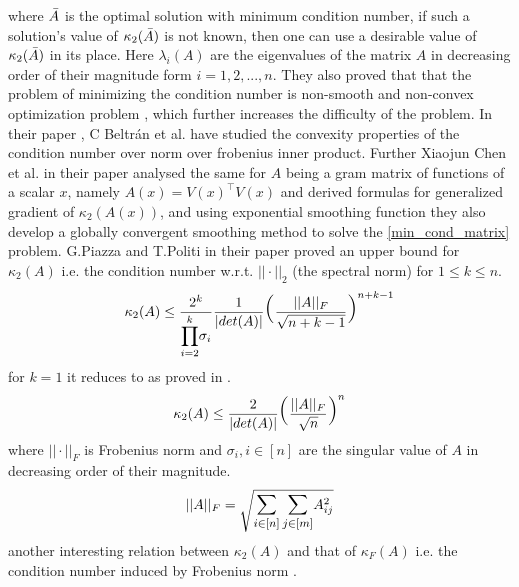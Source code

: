 where $\Bar{A}$ is the optimal solution with minimum condition number, if such a solution's value of $\kappa_2 (\Bar{A})$ is not known, then one can use a desirable value of $\kappa_2 (\Bar{A})$ in its place. Here $\lambda_i(A)$ are the eigenvalues of the matrix $A$ in decreasing order of their magnitude form $i=1,2,...,n$. They also proved that that the problem of minimizing the condition number is non-smooth and non-convex optimization problem \cite{marechal2009optimizing}, which further increases the difficulty of the problem. In their paper \cite{beltran2010convexity}, C Beltrán et al. have studied the convexity properties of the condition number over norm over frobenius inner product. Further Xiaojun Chen et al. in their paper \cite{chen2011minimizing} analysed the same for $A$ being a gram matrix of functions of a scalar $x$, namely $A(x) = V(x)^{\top}V(x)$ and derived formulas for generalized gradient of $\kappa_2(A(x))$, and using exponential smoothing function they also develop a globally convergent smoothing method to solve the \ref{min_cond_matrix} problem.
\newline \newline G.Piazza and T.Politi in their paper \cite{piazza2002upper} proved an upper bound for $\kappa_2 (A)$ i.e. the condition number w.r.t. $||\cdot||_2$ (the spectral norm) for $1\le k \le n$. 
\begin{equation} \label{cond_matx_ub_1}
    \kappa_2 (A) \le \frac{2^k}{\mathlarger{\prod_{i=2}^{k}} \sigma_i}\frac{1}{|det(A)|}\mathlarger{\mathlarger{\mathlarger{\mathlarger{(}}}} \frac{||A||_F}{\sqrt{n+k-1}}\mathlarger{\mathlarger{\mathlarger{\mathlarger{)}}}} ^{n+k-1}
\end{equation}
for $k=1$ it reduces to as proved in \cite{guggenheimer1995simple}.
\begin{equation} \label{cond_matx_ub_1.1}
    \kappa_2 (A) \le \frac{2}{|det(A)|}\mathlarger{\mathlarger{\mathlarger{\mathlarger{(}}}} \frac{||A||_F}{\sqrt{n}}\mathlarger{\mathlarger{\mathlarger{\mathlarger{) }}}} ^{n}
\end{equation}
where $||\cdot||_F$ is Frobenius norm and $\sigma_i, i\in [n]$ are the singular value of $A$ in decreasing order of their magnitude.
\begin{equation} \label{frobenius_norm}
    ||A||_F = \sqrt{ \mathlarger{\sum_{i \in [n]} \sum_{j \in [m]}} A^{2}_{ij}} 
\end{equation}
another interesting relation between $\kappa_2(A)$ and that of $\kappa_F(A)$ i.e. the condition number induced by Frobenius norm \cite{datta1995numerical}\cite{chehab2008geometrical}.
